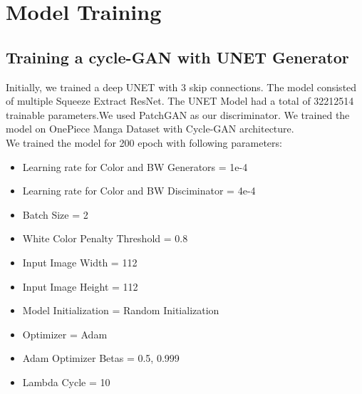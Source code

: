 \section{Model Training}

\subsection{Training a cycle-GAN with UNET Generator}
Initially, we trained a deep UNET with 3 skip connections. The model consisted of multiple Squeeze Extract ResNet. The UNET Model had a total of
32212514 trainable parameters.We used PatchGAN as our discriminator. We trained the model on OnePiece Manga Dataset with Cycle-GAN architecture.
\\
We trained the model for 200 epoch with following parameters:
\begin{itemize}
        \item Learning rate for Color and BW Generators = 1e-4
        \item Learning rate for Color and BW Disciminator = 4e-4
        \item Batch Size = 2
        \item White Color Penalty Threshold = 0.8
        \item Input Image Width = 112
        \item Input Image Height = 112
        \item Model Initialization = Random Initialization
        \item Optimizer = Adam
        \item Adam Optimizer Betas = 0.5, 0.999
        \item Lambda Cycle = 10
\end{itemize}

